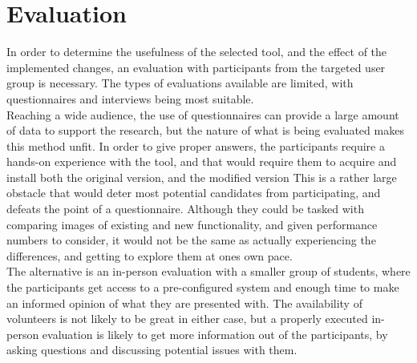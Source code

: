 \section{Evaluation}\label{methEval}
In order to determine the usefulness of the selected tool, and the  effect of the implemented changes, an evaluation with participants from the targeted user group is necessary.
The types of evaluations available are limited, with questionnaires and interviews being most suitable.
~\\

Reaching a wide audience, the use of questionnaires can provide a large amount of data to support the research, but the nature of what is being evaluated makes this method unfit.
In order to give proper answers, the participants require a hands-on experience with the tool, and that would require them to acquire and install both the original version, and the modified version
This is a rather large obstacle that would deter most potential candidates from participating, and defeats the point of a questionnaire.
Although they could be tasked with comparing images of existing and new functionality, and given performance numbers to consider, it would not be the same as actually experiencing the differences, and getting to explore them at ones own pace.
~\\

The alternative is an in-person evaluation with a smaller group of students, where the participants get access to a pre-configured system and enough time to make an informed opinion of what they are presented with.
The availability of volunteers is not likely to be great in either case, but a properly executed in-person evaluation is likely to get more information out of the participants, by asking questions and discussing potential issues with them.


